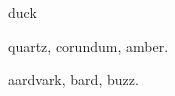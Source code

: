 \documentclass{article}
\begin{document}
\gls{duck}%

\gls{quartz}, \gls{corundum}, \gls{amber}.

\gls{aardvark}, \gls{bard}, \gls{buzz}.

\printunsrtglossaries
\end{document}
